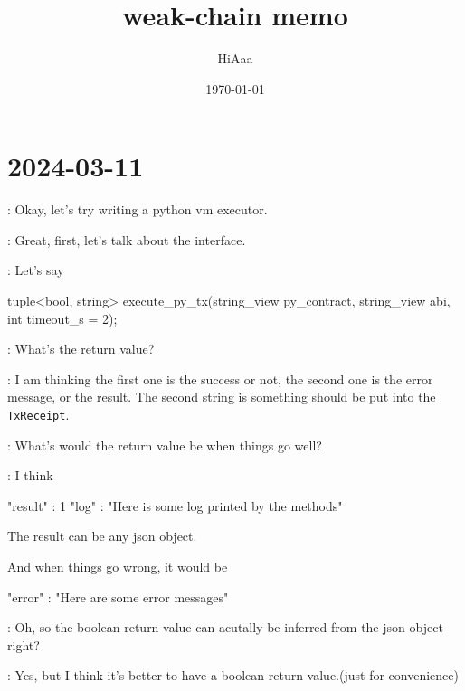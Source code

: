 \documentclass[dvipsnames]{article}
\title{weak-chain memo}
\date{\today}
\author{HiAaa}
\begin{document}
\maketitle
\tableofcontents{}
\newpage{}

% 
% 
% 
% 

\section*{2024-03-11}

 :  Okay, let's try writing a python vm executor.

 : Great, first, let's talk about the interface.

 : Let's say

\begin{simplec}
tuple<bool, string> execute_py_tx(string_view py_contract, string_view abi, int timeout_s = 2);
\end{simplec}

 : What's the return value?

 : I am thinking the first one is the success or not, the second
one is the error message, or the result. The second string is something should
be put into the \texttt{TxReceipt}.

 : What's would the return value be when things go well?

 : I think

\begin{simplejs}
{
    "result" : 1
    "log" : "Here is some log printed by the methods"
}
\end{simplejs}

The result can be any json object.

And when things go wrong, it would be
\begin{simplejs}
{
    "error" : "Here are some error messages"
}
\end{simplejs}

 : Oh, so the boolean return value can acutally be inferred from
the json object right?

 : Yes, but I think it's better to have a boolean return
value.(just for convenience)
\end{document}
